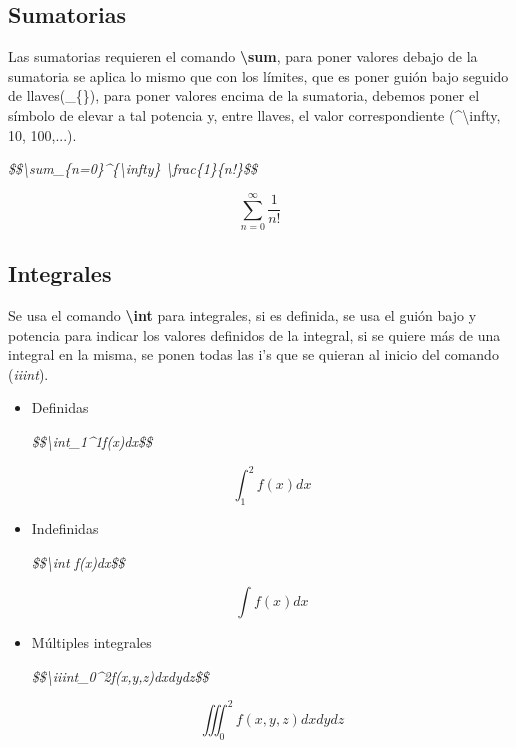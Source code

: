 \subsection{Sumatorias}
\hspace{0.55cm}Las sumatorias requieren el comando \textbf{\textbackslash{sum}}, para poner valores debajo de la sumatoria se aplica lo mismo que con los límites, que es poner guión bajo seguido de llaves(\_\{\}), para poner valores encima de la sumatoria, debemos poner el símbolo de elevar a tal potencia y, entre llaves, el valor correspondiente (\textasciicircum{\textbackslash{infty}}, 10, 100,...).
\begin{center}
    \textit{\$\$\textbackslash{sum\_\{n=0\}}\textasciicircum{\{\textbackslash{infty}\}} \textbackslash{frac\{1\}\{n!\}}\$\$}
\end{center}
$$\sum_{n=0}^{\infty} \frac{1}{n!}$$


\subsection{Integrales}
\hspace{0.55cm}Se usa el comando \textbf{\textbackslash{int}} para integrales, si es definida, se usa el guión bajo y potencia para indicar los valores definidos de la integral, si se quiere más de una integral en la misma, se ponen todas las i's que se quieran al inicio del comando (\textit{iiint}).
\begin{itemize}
    \item Definidas
    \begin{center}
        \textit{\$\$\textbackslash{int\_1\textasciicircum{1}}f(x)dx\$\$}
    \end{center}
    $$\int_1^2f(x)dx$$
    \item Indefinidas
    \begin{center}
        \textit{\$\$\textbackslash{int f(x)dx}\$\$}
    \end{center}
    $$\int f(x)dx$$
    \item Múltiples integrales
    \begin{center}
        \textit{\$\$\textbackslash{iiint\_0\textasciicircum{2}}f(x,y,z)dxdydz\$\$}
    \end{center}
    $$\iiint_0^2f(x,y,z)dxdydz$$
\end{itemize}


